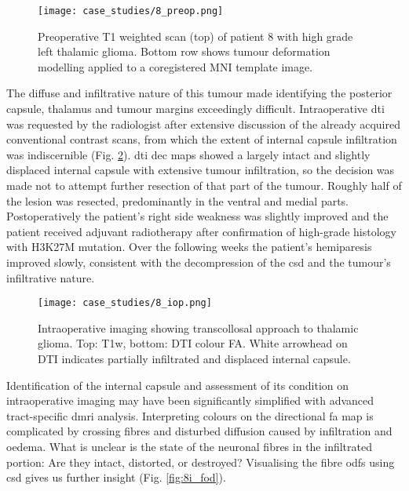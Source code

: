 \begin{figure}
  \centering
  \texttt{[image: case\_studies/8\_preop.png]}
  \caption{Preoperative T1 weighted scan (top) of patient 8 with high grade left thalamic glioma. Bottom row shows tumour deformation modelling applied to a coregistered MNI template image.}
  \label{fig:8p}
\end{figure}

The diffuse and infiltrative nature of this tumour made identifying the posterior capsule, thalamus and tumour margins exceedingly difficult.
Intraoperative \gls{dti} was requested by the radiologist after extensive discussion of the already acquired conventional contrast scans, from which the extent of internal capsule infiltration was indiscernible (Fig. \ref{fig:8i}).
\Gls{dti} \gls{dec} maps showed a largely intact and slightly displaced internal capsule with extensive tumour infiltration, so the decision was made not to attempt further resection of that part of the tumour.
Roughly half of the lesion was resected, predominantly in the ventral and medial parts.
Postoperatively the patient's right side weakness was slightly improved and the patient received adjuvant radiotherapy after confirmation of high-grade histology with H3K27M mutation.
Over the following weeks the patient's hemiparesis improved slowly, consistent with the decompression of the \gls{csd} and the tumour's infiltrative nature.

\begin{figure}
  \centering
  \texttt{[image: case\_studies/8\_iop.png]}
  \caption{Intraoperative imaging showing transcollosal approach to thalamic glioma. Top: T1w, bottom: DTI colour FA. White arrowhead on DTI indicates partially infiltrated and displaced internal capsule.}
  \label{fig:8i}
\end{figure}

Identification of the internal capsule and assessment of its condition on intraoperative imaging may have been significantly simplified with advanced tract-specific \gls{dmri} analysis.
Interpreting colours on the directional \gls{fa} map is complicated by crossing fibres and disturbed diffusion caused by infiltration and oedema.
What is unclear is the state of the neuronal fibres in the infiltrated portion: Are they intact, distorted, or destroyed?
Visualising the fibre \glspl{odf} using \gls{csd} gives us further insight (Fig. \ref{fig:8i_fod}).

